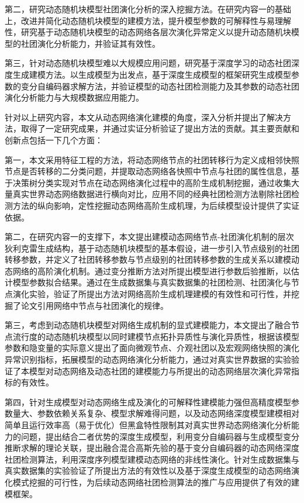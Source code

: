第二，研究动态随机块模型社团演化分析的深入挖掘方法。在研究内容一的基础上，改进并简化动态随机块模型的建模方法，提升模型参数的可解释性与易理解性，研究基于动态随机块模型的动态网络各层次演化异常定义以提升动态随机块模型的社团演化分析能力，并验证其有效性。

第三，针对动态随机块模型难以大规模应用问题，研究基于深度学习的动态社团深度生成建模方法。以生成模型为出发点，基于深度生成模型的框架研究生成模型参数的变分自编码器求解方法，并验证模型的动态社团检测能力及其参数的动态社团演化分析能力与大规模数据应用能力。

针对以上研究内容，本文从动态网络演化建模的角度，深入分析并提出了解决方法，取得了一定研究成果，并通过实证分析验证了提出方法的贡献。其主要贡献和创新点包括一下几个方面：

第一，本文采用特征工程的方法，将动态网络节点的社团转移行为定义成相邻快照节点是否转移的二分类问题，并提取动态网络各快照中节点与社团的属性信息，基于决策树分类实现对节点在动态网络演化过程中的高阶生成机制挖掘，通过收集大量真实世界动态网络数据进行横向对比，应用不同的经典社团检测方法剔除社团检测方法的纵向影响，定性挖掘动态网络高阶生成机理，为后续模型设计提供了实证依据。

第二，在研究内容一的支撑下，本文提出建模动态网络节点-社团演化机制的层次狄利克雷生成结构，基于动态随机块模型的基本假设，进一步引入节点级别的社团转移参数，并定义了社团转移参数与节点级别的社团转移参数的生成关系以建模动态网络的高阶演化机制。通过变分推断方法对所提出模型进行参数后验推断，以估计模型参数拟合结果。通过在生成数据集与真实数据集的社团检测、社团演化与节点演化实验，验证了所提出方法对网络高阶生成机理建模的有效性和可行性，并挖掘了论文引用网络中节点与社团演化的规律。

第三，考虑到动态随机块模型对网络生成机制的显式建模能力，本文提出了融合节点流行度的动态随机块模型以同时建模节点拓扑异质性与演化异质性，根据该模型参数和隐变量的实际意义提出了面向微观节点、介观社团以及宏观网络快照的演化异常识别指标，拓展模型的动态网络演化分析能力，通过对真实世界数据的实验验证了本模型对动态网络及动态社团的建模能力与所提出的动态网络层次演化异常指标的有效性。

第四，针对生成模型对动态网络生成及演化的可解释性建模能力强但高精度模型参数量大、参数依赖关系复杂、模型求解难得问题，以及动态网络深度模型建模相对简单且运行效率高（易于优化）但黑盒特性限制其对真实世界动态网络演化分析能力的问题，提出结合二者优势的深度生成模型，利用变分自编码器与生成模型变分推断求解的理论关联，提出融合混合高斯先验的基于变分自编码器的动态网络深度社团检测算法，利用深度序列模型建模动态网络的非线性演化。针对生成数据集与真实数据集的实验验证了所提出方法的有效性以及基于深度生成模型的动态网络演化模式挖掘的可行性，为后续动态网络社团检测算法的推广与应用提供了有效的建模框架。

